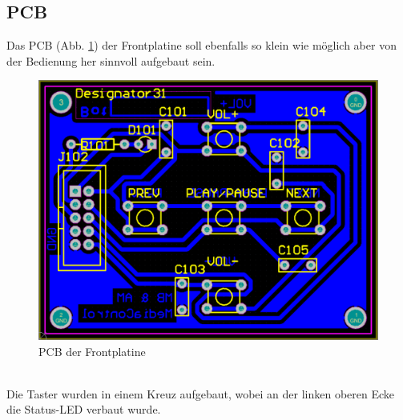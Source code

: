 \subsection{PCB}
Das PCB (Abb. \ref {fig:abb3.8}) der Frontplatine soll ebenfalls so klein wie möglich aber von der Bedienung her sinnvoll aufgebaut sein.
\begin{figure} [h]
	\centering
	\includegraphics[width=1\textwidth]{schaltungen/front_pcb.png}
	\caption{PCB der Frontplatine}\label {fig:abb3.8}
\end{figure} \\
Die Taster wurden in einem Kreuz aufgebaut, wobei an der linken oberen Ecke die Status-LED verbaut wurde.







